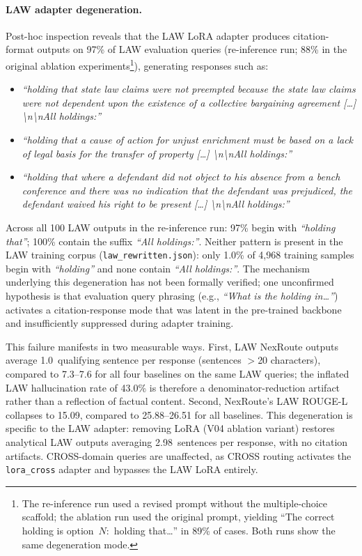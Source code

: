 \documentclass[a4paper,fleql]{cas-sc}
\begin{document}
\label{ssec:law-degeneration}
\paragraph{LAW adapter degeneration.}
Post-hoc inspection reveals that the LAW LoRA adapter produces citation-format
outputs on 97\% of LAW evaluation queries (re-inference run; 88\% in the original
ablation experiments\footnote{The re-inference run used a revised prompt without
the multiple-choice scaffold; the ablation run used the original prompt, yielding
``The correct holding is option~$N$:~holding that\ldots'' in 89\% of cases.
Both runs show the same degeneration mode.}),
generating responses such as:
\begin{itemize}\small
  \item \textit{``holding that state law claims were not preempted because the
  state law claims were not dependent upon the existence of a collective bargaining
  agreement [\ldots] \textbackslash n\textbackslash nAll holdings:''}
  \item \textit{``holding that a cause of action for unjust enrichment must be
  based on a lack of legal basis for the transfer of property [\ldots]
  \textbackslash n\textbackslash nAll holdings:''}
  \item \textit{``holding that where a defendant did not object to his absence from
  a bench conference and there was no indication that the defendant was prejudiced,
  the defendant waived his right to be present [\ldots]
  \textbackslash n\textbackslash nAll holdings:''}
\end{itemize}
Across all 100 LAW outputs in the re-inference run: 97\% begin with
\textit{``holding that''}; 100\% contain the suffix \textit{``All holdings:''}.
Neither pattern is present in the LAW training corpus
(\texttt{law\_rewritten.json}): only 1.0\% of 4,968 training samples begin
with \textit{``holding''} and none contain \textit{``All holdings:''}.
The mechanism underlying this degeneration has not been formally verified;
one unconfirmed hypothesis is that evaluation query phrasing
(e.g., \textit{``What is the holding in\ldots''}) activates a citation-response
mode that was latent in the pre-trained backbone and insufficiently suppressed
during adapter training.

This failure manifests in two measurable ways.
First, LAW NexRoute outputs average 1.0~qualifying sentence per response
(sentences $>$20 characters), compared to 7.3--7.6 for all four baselines
on the same LAW queries; the inflated LAW hallucination rate of 43.0\% is
therefore a denominator-reduction artifact rather than a reflection of factual content.
Second, NexRoute's LAW ROUGE-L collapses to 15.09, compared to 25.88--26.51
for all baselines.
This degeneration is specific to the LAW adapter: removing LoRA (V04 ablation
variant) restores analytical LAW outputs averaging 2.98~sentences per response,
with no citation artifacts.
CROSS-domain queries are unaffected, as CROSS routing activates the
\texttt{lora\_cross} adapter and bypasses the LAW LoRA entirely.
\end{document}
